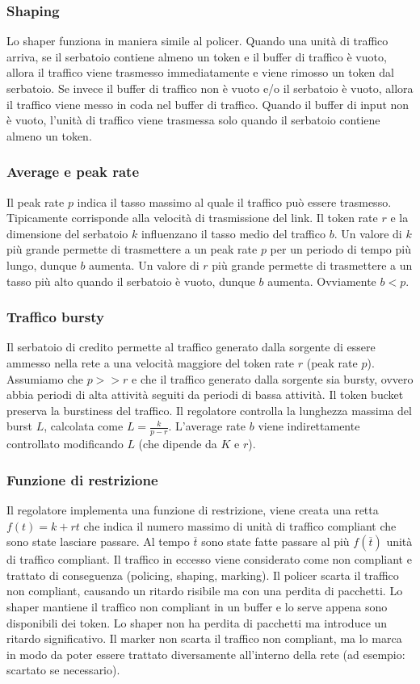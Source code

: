 \subsubsection{Shaping}
Lo shaper funziona in maniera simile al policer.
Quando una unità di traffico arriva, se il serbatoio contiene almeno un token e il buffer di traffico è vuoto, allora il traffico viene trasmesso immediatamente e viene rimosso un token dal serbatoio.
Se invece il buffer di traffico non è vuoto e/o il serbatoio è vuoto, allora il traffico viene messo in coda nel buffer di traffico.
Quando il buffer di input non è vuoto, l'unità di traffico viene trasmessa solo quando il serbatoio contiene almeno un token.
\subsubsection{Average e peak rate}
Il peak rate $p$ indica il tasso massimo al quale il traffico può essere trasmesso.
Tipicamente corrisponde alla velocità di trasmissione del link.
Il token rate $r$ e la dimensione del serbatoio $k$ influenzano il tasso medio del traffico $b$.
Un valore di $k$ più grande permette di trasmettere a un peak rate $p$ per un periodo di tempo più lungo, dunque $b$ aumenta.
Un valore di $r$ più grande permette di trasmettere a un tasso più alto quando il serbatoio è vuoto, dunque $b$ aumenta.
Ovviamente $b < p$. 
\subsubsection{Traffico bursty}
Il serbatoio di credito permette al traffico generato dalla sorgente di essere ammesso nella rete a una velocità maggiore del token rate $r$ (peak rate $p$).
Assumiamo che $p >> r$ e che il traffico generato dalla sorgente sia bursty, ovvero abbia periodi di alta attività seguiti da periodi di bassa attività.
Il token bucket preserva la burstiness del traffico.
Il regolatore controlla la lunghezza massima del burst $L$, calcolata come $L=\frac{k}{p-r}$.
L'average rate $b$ viene indirettamente controllato modificando $L$ (che dipende da $K$ e $r$).
\subsubsection{Funzione di restrizione}
Il regolatore implementa una funzione di restrizione, viene creata una retta $f(t)=k+rt$ che indica il numero massimo di unità di traffico compliant che sono state lasciare passare.
Al tempo $\overline{t}$ sono state fatte passare al più $f(\overline{t})$ unità di traffico compliant.
Il traffico in eccesso viene considerato come non compliant e trattato di conseguenza (policing, shaping, marking).
Il policer scarta il traffico non compliant, causando un ritardo risibile ma con una perdita di pacchetti.
Lo shaper mantiene il traffico non compliant in un buffer e lo serve appena sono disponibili dei token. Lo shaper non ha perdita di pacchetti ma introduce un ritardo significativo.
Il marker non scarta il traffico non compliant, ma lo marca in modo da poter essere trattato diversamente all'interno della rete (ad esempio: scartato se necessario).
